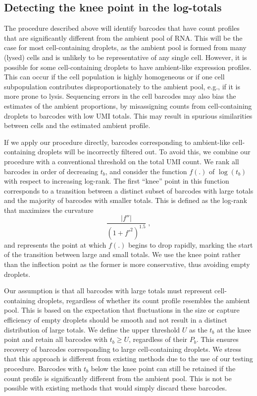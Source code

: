\documentclass[10pt,letterpaper]{article}
\begin{document}
\subsection*{Detecting the knee point in the log-totals}
The procedure described above will identify barcodes that have count profiles that are significantly different from the ambient pool of RNA.
This will be the case for most cell-containing droplets, as the ambient pool is formed from many (lysed) cells and is unlikely to be representative of any single cell.
However, it is possible for some cell-containing droplets to have ambient-like expression profiles.
This can occur if the cell population is highly homogeneous or if one cell subpopulation contributes disproportionately to the ambient pool, e.g., if it is more prone to lysis.
Sequencing errors in the cell barcodes may also bias the estimates of the ambient proportions, by misassigning counts from cell-containing droplets to barcodes with low UMI totals.
This may result in spurious similarities between cells and the estimated ambient profile.

If we apply our procedure directly, barcodes corresponding to ambient-like cell-containing droplets will be incorrectly filtered out.
To avoid this, we combine our procedure with a conventional threshold on the total UMI count.
We rank all barcodes in order of decreasing $t_b$, and consider the function $f(.)$ of $\log(t_b)$ with respect to increasing log-rank.
The first ``knee'' point in this function corresponds to a transition between a distinct subset of barcodes with large totals and the majority of barcodes with smaller totals.
This is defined as the log-rank that maximizes the curvature
\[
    \frac{|f''|}{(1 + f'^2)^{1.5}} \;,
\]
and represents the point at which $f(.)$ begins to drop rapidly, marking the start of the transition between large and small totals.
We use the knee point rather than the inflection point as the former is more conservative, thus avoiding empty droplets.

Our assumption is that all barcodes with large totals must represent cell-containing droplets, regardless of whether its count profile resembles the ambient pool.
This is based on the expectation that fluctuations in the size or capture efficiency of empty droplets should be smooth and not result in a distinct distribution of large totals.
We define the upper threshold $U$ as the $t_b$ at the knee point and retain all barcodes with $t_b \ge U$, regardless of their $P_b$.
This ensures recovery of barcodes corresponding to large cell-containing droplets. 
We stress that this approach is different from existing methods due to the use of our testing procedure.
Barcodes with $t_b$ below the knee point can still be retained if the count profile is significantly different from the ambient pool.
This is not be possible with existing methods that would simply discard these barcodes.
\end{document}
